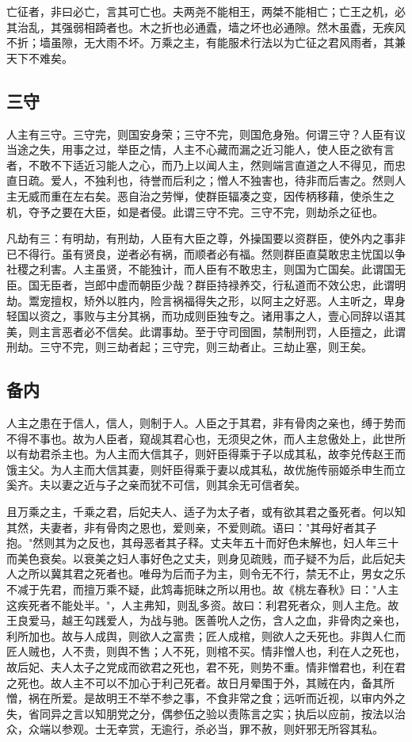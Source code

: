 \documentclass[]{article}
\begin{document}
亡征者，非曰必亡，言其可亡也。夫两尧不能相王，两桀不能相亡；亡王之机，必其治乱，其强弱相踦者也。木之折也必通蠹，墙之坏也必通隙。然木虽蠹，无疾风不折；墙虽隙，无大雨不坏。万乘之主，有能服术行法以为亡征之君风雨者，其兼天下不难矣。

\hypertarget{header-n914}{%
\subsection{三守}\label{header-n914}}

人主有三守。三守完，则国安身荣；三守不完，则国危身殆。何谓三守？人臣有议当途之失，用事之过，举臣之情，人主不心藏而漏之近习能人，使人臣之欲有言者，不敢不下适近习能人之心，而乃上以闻人主，然则端言直道之人不得见，而忠直日疏。爱人，不独利也，待誉而后利之；憎人不独害也，待非而后害之。然则人主无威而重在左右矣。恶自治之劳惮，使群臣辐凑之变，因传柄移藉，使杀生之机，夺予之要在大臣，如是者侵。此谓三守不完。三守不完，则劫杀之征也。

凡劫有三：有明劫，有刑劫，人臣有大臣之尊，外操国要以资群臣，使外内之事非已不得行。虽有贤良，逆者必有祸，而顺者必有福。然则群臣直莫敢忠主忧国以争社稷之利害。人主虽贤，不能独计，而人臣有不敢忠主，则国为亡国矣。此谓国无臣。国无臣者，岂郎中虚而朝臣少哉？群臣持禄养交，行私道而不效公忠，此谓明劫。鬻宠擅权，矫外以胜内，险言祸福得失之形，以阿主之好恶。人主听之，卑身轻国以资之，事败与主分其祸，而功成则臣独专之。诸用事之人，壹心同辞以语其美，则主言恶者必不信矣。此谓事劫。至于守司囹圄，禁制刑罚，人臣擅之，此谓刑劫。三守不完，则三劫者起；三守完，则三劫者止。三劫止塞，则王矣。

\hypertarget{header-n917}{%
\subsection{备内}\label{header-n917}}

人主之患在于信人，信人，则制于人。人臣之于其君，非有骨肉之亲也，缚于势而不得不事也。故为人臣者，窥觇其君心也，无须臾之休，而人主怠傲处上，此世所以有劫君杀主也。为人主而大信其子，则奸臣得乘于子以成其私，故李兑传赵王而饿主父。为人主而大信其妻，则奸臣得乘于妻以成其私，故优施传丽姬杀申生而立奚齐。夫以妻之近与子之亲而犹不可信，则其余无可信者矣。

且万乘之主，千乘之君，后妃夫人、适子为太子者，或有欲其君之蚤死者。何以知其然，夫妻者，非有骨肉之恩也，爱则亲，不爱则疏。语曰："其母好者其子抱。"然则其为之反也，其母恶者其子释。丈夫年五十而好色未解也，妇人年三十而美色衰矣。以衰美之妇人事好色之丈夫，则身见疏贱，而子疑不为后，此后妃夫人之所以冀其君之死者也。唯母为后而子为主，则令无不行，禁无不止，男女之乐不减于先君，而擅万乘不疑，此鸩毒扼昧之所以用也。故《桃左春秋》曰："人主这疾死者不能处半。"，人主弗知，则乱多资。故曰：利君死者众，则人主危。故王良爱马，越王勾践爱人，为战与驰。医善吮人之伤，含人之血，非骨肉之亲也，利所加也。故与人成舆，则欲人之富贵；匠人成棺，则欲人之夭死也。非舆人仁而匠人贼也，人不贵，则舆不售；人不死，则棺不买。情非憎人也，利在人之死也，故后妃、夫人太子之党成而欲君之死也，君不死，则势不重。情非憎君也，利在君之死也。故人主不可以不加心于利己死者。故日月晕围于外，其贼在内，备其所憎，祸在所爱。是故明王不举不参之事，不食非常之食；远听而近视，以审内外之失，省同异之言以知朋党之分，偶参伍之验以责陈言之实；执后以应前，按法以治众，众端以参观。士无幸赏，无逾行，杀必当，罪不赦，则奸邪无所容其私。
\end{document}
